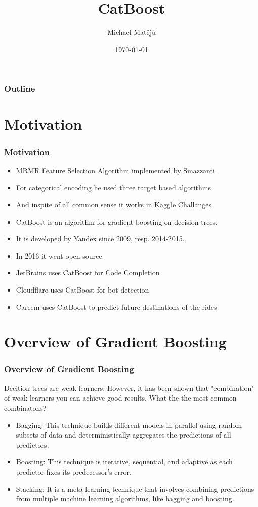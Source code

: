 \documentclass{beamer}
\title{CatBoost}
\author{Michael Mat\v{e}j\r{u}}
\institute[KB]{AI Squad}
\date{\today}
\begin{document}
    \begin{frame}
        \titlepage
    \end{frame}

    \begin{frame}
        \frametitle{Outline}
        \tableofcontents
    \end{frame}


    \section{Motivation}
    \begin{frame}
        \frametitle{Motivation}
        \begin{itemize}
            \item MRMR Feature Selection Algorithm implemented by Smazzanti
            \pause
            \item For categorical encoding he used three target based algorithms
            \pause
            \item And inspite of all common sense it works in Kaggle Challanges
            \pause
            \item CatBoost is an algorithm for gradient boosting on decision trees.
            \pause
            \item It is developed by Yandex since 2009, resp. 2014-2015.
            \pause
            \item In 2016 it went open-source.
            \pause
            \item JetBrains uses CatBoost for Code Completion
            \pause
            \item Cloudflare uses CatBoost for bot detection
            \pause
            \item Careem uses CatBoost to predict future destinations of the rides
        \end{itemize}
    \end{frame}


    \section{Overview of Gradient Boosting}
    \begin{frame}
        \frametitle{Overview of Gradient Boosting}
        Decition trees are weak learners. However, it has been shown that "combination" of weak
        learners you can achieve good results. What the the most common combinatons?
        \begin{itemize}
            \item Bagging: This technique builds different models in parallel using random
            subsets of data and deterministically aggregates the predictions of all predictors.
            \item Boosting: This technique is iterative, sequential, and adaptive as each
            predictor fixes its predecessor's error.
            \item Stacking: It is a meta-learning technique that involves combining predictions
            from multiple machine learning algorithms, like bagging and boosting.
        \end{itemize}
    \end{frame}
\end{document}
